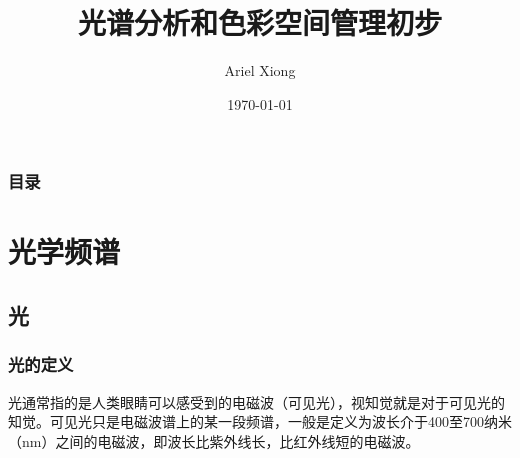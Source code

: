 \documentclass[8pt, aspectratio=169]{ctexbeamer}
\title[光学频谱分析和色彩空间管理初步]{光谱分析和色彩空间管理初步}
\author{Ariel Xiong} %
\institute[浙江工商大学] %
{
	浙江工商大学萨塞克斯人工智能学院 \\ %
	\medskip
	\textit{ArielHeleneto@outlook.com} %
}
\date{\today} %
\begin{document}
\begin{frame}
	\titlepage %
\end{frame}

\begin{frame}[allowframebreaks]
	\frametitle{目录} %
	\tableofcontents %
\end{frame}


\section{光学频谱} %
\subsection{光} %

\begin{frame}
	\frametitle{光的定义}
	\begin{definition}[光]
		光通常指的是人类眼睛可以感受到的电磁波（可见光），视知觉就是对于可见光的知觉。可见光只是电磁波谱上的某一段频谱，一般是定义为波长介于400至700纳米（nm）之间的电磁波，即波长比紫外线长，比红外线短的电磁波。
	\end{definition}
\end{frame}

\end{document}
